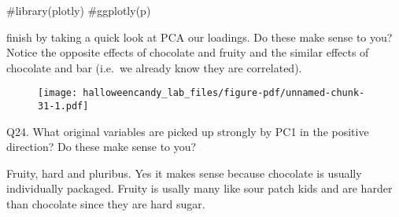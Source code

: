 \documentclass[
  letterpaper,
  DIV=11,
  numbers=noendperiod]{scrartcl}
\newenvironment{Shaded}{\begin{snugshade}}{\end{snugshade}}
\newcommand{\AttributeTok}[1]{\textcolor[rgb]{0.40,0.45,0.13}{#1}}
\newcommand{\CommentTok}[1]{\textcolor[rgb]{0.37,0.37,0.37}{#1}}
\newcommand{\DecValTok}[1]{\textcolor[rgb]{0.68,0.00,0.00}{#1}}
\newcommand{\FunctionTok}[1]{\textcolor[rgb]{0.28,0.35,0.67}{#1}}
\newcommand{\NormalTok}[1]{\textcolor[rgb]{0.00,0.23,0.31}{#1}}
\newcommand{\SpecialCharTok}[1]{\textcolor[rgb]{0.37,0.37,0.37}{#1}}
\newcommand{\StringTok}[1]{\textcolor[rgb]{0.13,0.47,0.30}{#1}}
\begin{document}
\begin{Shaded}
\begin{Highlighting}[]
\CommentTok{\#library(plotly)}
\CommentTok{\#ggplotly(p)}
\end{Highlighting}
\end{Shaded}

finish by taking a quick look at PCA our loadings. Do these make sense
to you? Notice the opposite effects of chocolate and fruity and the
similar effects of chocolate and bar (i.e.~we already know they are
correlated).

\begin{Shaded}
\end{Shaded}

\begin{figure}[H]

{\centering \texttt{[image: halloweencandy\_lab\_files/figure-pdf/unnamed-chunk-31-1.pdf]}

}

\end{figure}

Q24. What original variables are picked up strongly by PC1 in the
positive direction? Do these make sense to you?

Fruity, hard and pluribus. Yes it makes sense because chocolate is
usually individually packaged. Fruity is usally many like sour patch
kids and are harder than chocolate since they are hard sugar.
\end{document}
